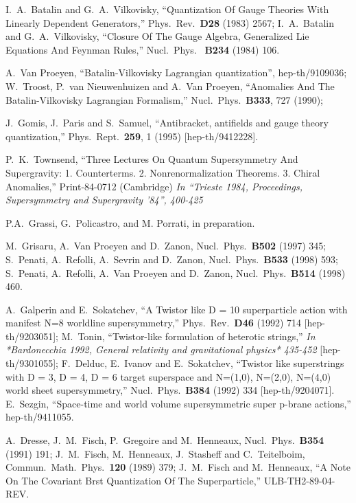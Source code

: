\documentclass[a4paper,12pt]{article}
\begin{document}
\begin{thebibliography}{99}
  I.~A.~Batalin and G.~A.~Vilkovisky, ``Quantization Of Gauge Theories
  With Linearly 
  Dependent Generators,'' Phys.\ Rev.\ {\bf D28} (1983) 2567;
  I.~A.~Batalin and G.~A.~Vilkovisky, ``Closure Of The Gauge Algebra,
  Generalized Lie Equations And Feynman Rules,'' Nucl.\ Phys.\ {\bf
    B234} (1984) 106.

 A.~Van Proeyen, ``Batalin-Vilkovisky Lagrangian quantization'',
  hep-th/9109036; W.~Troost, P.~van Nieuwenhuizen and A.~Van Proeyen,
  ``Anomalies And The Batalin-Vilkovisky Lagrangian Formalism,''
  Nucl.\ Phys.\ {\bf B333}, 727 (1990);

 J.~Gomis, J.~Paris and S.~Samuel,
``Antibracket, antifields and gauge theory quantization,'' Phys.\
 Rept.\  {\bf 259}, 1 (1995) [hep-th/9412228].

   P.~K.~Townsend, ``Three Lectures On Quantum Supersymmetry And
  Supergravity: 1. Counterterms. 2. Nonrenormalization Theorems. 3.
  Chiral Anomalies,'' Print-84-0712 (Cambridge) {\it In ``Trieste 1984,
    Proceedings, Supersymmetry and Supergravity '84'', 400-425}

  P.A.~Grassi, G.~Policastro, and M. Porrati, in preparation. 

   M.~Grisaru, A.~Van Proeyen and D.~Zanon, 
   Nucl.\ Phys.\ {\bf B502} (1997) 345; 
   S.~Penati, A.~Refolli, A.~Sevrin and D.~Zanon,
   Nucl.\ Phys.\  {\bf B533} (1998) 593; S.~Penati, A.~Refolli,
   A.~Van Proeyen and D.~Zanon, Nucl.\ Phys.\  {\bf B514} (1998) 460.
   
   A.~Galperin and E.~Sokatchev, ``A Twistor like
   D = 10 superparticle action with manifest N=8 worldline
   supersymmetry,'' Phys.\ Rev.\ {\bf D46} (1992) 714
   [hep-th/9203051]; M.~Tonin, ``Twistor-like formulation of heterotic
   strings,'' {\it In *Bardonecchia 1992, General relativity and
   gravitational physics* 435-452} [hep-th/9301055]; F.~Delduc,
   E.~Ivanov and E.~Sokatchev, ``Twistor like superstrings with D = 3,
   D = 4, D = 6 target superspace and N=(1,0), N=(2,0), N=(4,0) world
   sheet supersymmetry,'' Nucl.\ Phys.\ {\bf B384} (1992) 334
   [hep-th/9204071].  E.~Sezgin, ``Space-time and world volume
   supersymmetric super p-brane actions,'' hep-th/9411055.

A.~Dresse, J.~M.~Fisch, P.~Gregoire and M.~Henneaux,
Nucl.\ Phys.\  {\bf B354} (1991) 191; 
J.~M.~Fisch, M.~Henneaux, J.~Stasheff and C.~Teitelboim,
Commun.\ Math.\ Phys.\  {\bf 120} (1989) 379; 
J.~M.~Fisch and M.~Henneaux,
``A Note On The Covariant Brst Quantization Of The Superparticle,''
ULB-TH2-89-04-REV.


\end{thebibliography}
\end{document}
